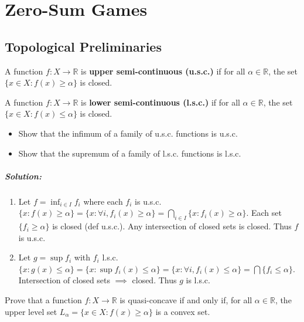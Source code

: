 \chapter{Zero-Sum Games}

\section{Topological Preliminaries}

\begin{definition}
A function $f:X \to \mathbb{R}$ is \textbf{upper semi-continuous (u.s.c.)} if for all $\alpha \in \mathbb{R}$, the set $\{x \in X : f(x) \ge \alpha\}$ is closed.

A function $f:X \to \mathbb{R}$ is \textbf{lower semi-continuous (l.s.c.)} if for all $\alpha \in \mathbb{R}$, the set $\{x \in X : f(x) \le \alpha\}$ is closed.
\end{definition}

\begin{exercice}
\begin{itemize}
    \item Show that the infimum of a family of u.s.c. functions is u.s.c.
    \item Show that the supremum of a family of l.s.c. functions is l.s.c.
\end{itemize}
\paragraph{Solution:}
\begin{enumerate}
    \item Let $f = \inf_{i \in I} f_i$ where each $f_i$ is u.s.c.
    $ \{ x : f(x) \ge \alpha \} = \{ x : \forall i, f_i(x) \ge \alpha \} = \bigcap_{i \in I} \{ x : f_i(x) \ge \alpha \} $.
    Each set $\{ f_i \ge \alpha \}$ is closed (def u.s.c.). Any intersection of closed sets is closed. Thus $f$ is u.s.c.
    
    \item Let $g = \sup f_i$ with $f_i$ l.s.c.
    $ \{ x : g(x) \le \alpha \} = \{ x : \sup f_i(x) \le \alpha \} = \{ x : \forall i, f_i(x) \le \alpha \} = \bigcap \{ f_i \le \alpha \}$.
    Intersection of closed sets $\implies$ closed. Thus $g$ is l.s.c.
\end{enumerate}
\end{exercice}


\begin{exercice}
Prove that a function $f:X \to \mathbb{R}$ is quasi-concave if and only if, for all $\alpha \in \mathbb{R}$, the upper level set $L_{\alpha} = \{x \in X : f(x) \ge \alpha\}$ is a convex set.
\end{exercice}

